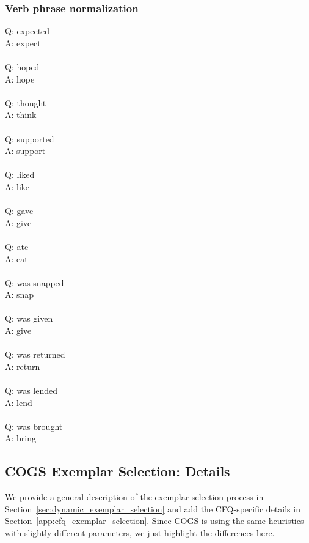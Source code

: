 \documentclass{article} \usepackage{iclr2022_conference,times}
\newcommand{\prompt}[1]{{\footnotesize \textsf{#1}}}
\begin{document}
\subsubsection{Verb phrase normalization}

\prompt{Q: expected \\
A: expect \\
 \\
Q: hoped \\
A: hope \\
\\
Q: thought \\
A: think \\
\\
Q: supported \\
A: support \\
\\
Q: liked \\
A: like \\
\\
Q: gave \\
A: give \\
\\
Q: ate \\
A: eat \\
\\
Q: was snapped \\
A: snap \\
\\
Q: was given \\
A: give \\
\\
Q: was returned \\
A: return \\
\\
Q: was lended \\
A: lend \\
\\
Q: was brought \\
A: bring}

\subsection{COGS Exemplar Selection: Details}
\label{app:cogs_exemplar_selection}

We provide a general description of the exemplar selection process in Section~\ref{sec:dynamic_exemplar_selection} and add the CFQ-specific details in Section~\ref{app:cfq_exemplar_selection}. Since COGS is using the same heuristics with slightly different parameters, we just highlight the differences here.
\end{document}
